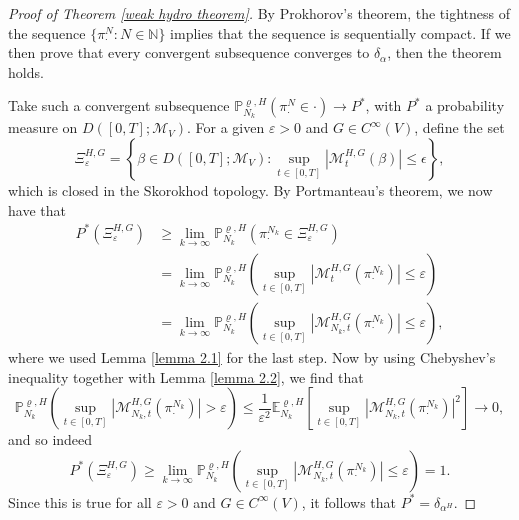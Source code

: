 \documentclass[11pt]{article}
\numberwithin{equation}{section}
\theoremstyle{definition}
\theoremstyle{plain}
\newcommand{\E}{\mathbb{E}}
\newcommand{\p}{\mathbb{P}}
\newcommand{\nn}{\nonumber}
\begin{document}
\begin{proof}[Proof of Theorem \ref{weak hydro theorem}]
By Prokhorov's theorem, the tightness of the sequence $\{\pi^N_{\cdot}:N\in\mathbb{N}\}$ implies that the sequence is sequentially compact. If we then prove that every convergent subsequence converges to $\delta_\alpha$, then the theorem holds. 
    
Take such a convergent subsequence $\p^{\varrho,H}_{N_k}(\pi^N_{\cdot}\in\cdot) \to P^*$, with $P^*$ a probability measure on $D([0,T];\mathcal{M}_V)$.  For a given $\varepsilon>0$  and $G \in C^\infty(V)$,
define the set 
    \begin{equation}
        \Xi^{H,G}_{\varepsilon} = \left\{ \beta \in D([0,T];\mathcal{M}_V) : \sup_{t\in[0,T]} \left|\mathscr{M}^{H,G}_t(\beta)\right| \leq \epsilon \right\},
    \end{equation}
which is closed in the Skorokhod topology. By Portmanteau's theorem, we now have that 
    \begin{align}
        P^*(\Xi^{H,G}_{\varepsilon}) 
        &\nn\geq \lim_{k\to\infty} \p^{\varrho,H}_{N_k} (\pi^{N_k}_{\cdot} \in \Xi^{H,G}_{\varepsilon})\\
        \nn&= \lim_{k\to\infty} \p^{\varrho,H}_{N_k}\left( \sup_{t\in[0,T]} \left|\mathscr{M}_t^{H,G}(\pi^{N_k}_{\cdot})\right|\leq \varepsilon\right)\\
        &= \lim_{k\to\infty} \p^{\varrho,H}_{N_k}\left( \sup_{t\in[0,T]} \left|\mathscr{M}_{N_k,t}^{H,G}(\pi^{N_k}_{\cdot})\right| \leq \varepsilon\right),
    \end{align}
where we used Lemma \ref{lemma 2.1} for the last step. Now by using Chebyshev's inequality together with Lemma \ref{lemma 2.2}, we find that \\
    \begin{equation}
        \p^{\varrho,H}_{N_k}\left( \sup_{t\in[0,T]} \left|\mathscr{M}_{N_k,t}^{H,G}(\pi^{N_k}_{\cdot})\right| > \varepsilon\right) \leq \frac{1}{\varepsilon^2} \E^{\varrho,H}_{N_k}\left[  \sup_{t\in[0,T]} \left|\mathscr{M}_{N_k,t}^{H,G}(\pi^{N_k}_{\cdot})\right|^2 \right] \to 0,
    \end{equation}
and so indeed 
    \begin{equation}
        P^*(\Xi^{H,G}_{\varepsilon}) 
        \geq \lim_{k\to\infty} \p^{\varrho,H}_{N_k}\left( \sup_{t\in[0,T]} \left|\mathscr{M}_{N_k,t}^{H,G}(\pi^{N_k}_{\cdot})\right| \leq \varepsilon\right) = 1.
    \end{equation}
Since this is true for all $\varepsilon>0$ and $G\in C^{\infty}(V)$, it follows that $P^*=\delta_{\alpha^H}$.
\end{proof}\ \\



\end{document}
